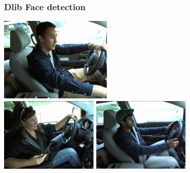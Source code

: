 \documentclass{beamer}
\begin{document}
	\begin{frame}
		\frametitle{Dlib Face detection}
		\begin{center}
			\includegraphics[width=0.4\textwidth]{faces/dlibface1} \\ \vspace{0.1cm}
			\includegraphics[width=0.35\textwidth]{faces/dlibface2} \hspace{0.1cm}
			\includegraphics[width=0.35\textwidth]{faces/dlibface3}
		\end{center}		
	\end{frame}
    

	
	
\end{document}
